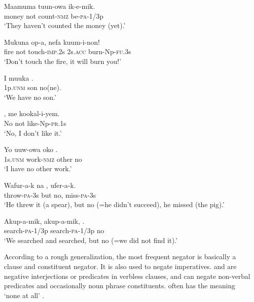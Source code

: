 \ea%
\label{ex:3:x654}
\gll Maamuma  tuun-owa ik-e-mik. \\
money not count-\textsc{nmz} be-\textsc{pa}-1/3p\\
\glt`They haven't counted the money (yet).'
\z

\ea%
\label{ex:3:x1112}
\gll Mukuna  op-a, nefa kuum-i-non! \\
fire not touch-\textsc{imp}.2s 2s.\textsc{acc} burn-Np-\textsc{fu}.3s\\
\glt`Don't touch the fire, it will burn you!'
\z

\ea%
\label{ex:3:x655}
\gll I muuka . \\
1p.\textsc{unm} son no(ne).\\
\glt`We have no son.'
\z

\ea%
\label{ex:3:x707}
\gll {}, me kookal-i-yem. \\
No not like-Np-\textsc{pr}.1s \\
\glt`No, I don't like it.'
\z

\ea%
\label{ex:3:x1212}
\gll Yo uuw-owa oko . \\
1s.\textsc{unm} work-\textsc{nmz} other no\\
\glt`I have no other work.'
\z

\ea%
\label{ex:3:x705}
\gll Wafur-a-k na , ufer-a-k. \\
throw-\textsc{pa}-3s but no, miss-\textsc{pa}-3s\\
\glt`He threw it (a spear), but no (=he didn't succeed), he missed (the pig).'
\z

\ea%
\label{ex:3:x1111}
\gll Akup-a-mik, akup-a-mik, . \\
search-\textsc{pa}-1/3p search-\textsc{pa}-1/3p no\\
\glt`We searched and searched, but no (=we did not find it).'
\z

According to a rough generalization, the most frequent negator  is basically a clause and constituent negator. It is also used to negate imperatives.  and  are negative interjections or predicates in verbless clauses, and  can negate non-verbal predicates and occasionally noun phrase constituents.  often has the meaning `none at all'  .

